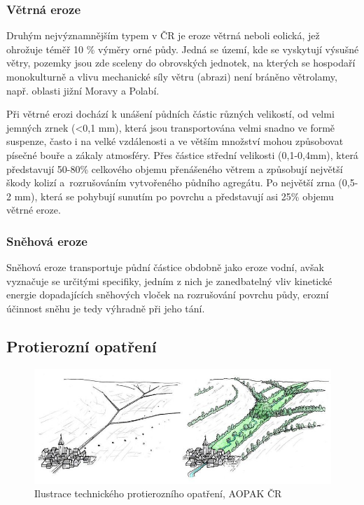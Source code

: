 \subsubsection{Větrná eroze}
Druhým nejvýznamnějším typem v ČR je eroze větrná neboli eolická, jež ohrožuje téměř 10 \% výměry orné půdy. Jedná se území, kde se vyskytují výsušné větry, pozemky jsou zde sceleny do obrovských jednotek, na kterých se hospodaří monokulturně a vlivu mechanické síly větru (abrazi) není bráněno větrolamy, např. oblasti jižní Moravy a Polabí. 

Při větrné erozi dochází k unášení půdních částic různých velikostí, od velmi jemných zrnek (<0,1 mm), která jsou transportována velmi snadno ve formě suspenze, často i na velké vzdálenosti a ve větším množství mohou způsobovat písečné bouře a zákaly atmosféry. Přes částice střední velikosti (0,1-0,4mm), která představují 50-80\% celkového objemu přenášeného větrem a způsobují největší škody kolizí a~rozrušováním vytvořeného půdního agregátu. Po největší zrna (0,5-2 mm), která se pohybují sunutím po povrchu a představují asi 25\% objemu větrné eroze.\cite{Holy1994}

\subsubsection{Sněhová eroze}
Sněhová eroze transportuje půdní částice obdobně jako eroze vodní, avšak vyznačuje se určitými specifiky, jedním z nich je zanedbatelný vliv kinetické energie dopadajících sněhových vloček na rozrušování povrchu půdy, erozní účinnost sněhu je tedy výhradně při jeho tání.\cite{Holy1994}

\subsection{Protierozní opatření}
\begin{figure}[H]
    \centering
      \includegraphics[scale=0.5]{./pictures/protierozni_opatreni.jpg}
      \caption[Ilustrace technického protierozního opatření]{Ilustrace technického protierozního opatření, AOPAK ČR\cite{AOPAK} }
      \label{fig:r_faktor_graph}
\end{figure}

